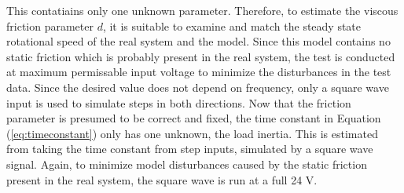 \documentclass[12pt,a4paper]{article}
\begin{document}
This contatiains only one unknown parameter. Therefore, to estimate the viscous
friction parameter $d$, it is suitable to examine and match the steady state
rotational speed of the real system and the model. Since this model contains no
static friction which is probably present in the real system, the test is
conducted at maximum permissable input voltage to minimize the disturbances in
the test data. Since the desired value does not depend on frequency, only a
square wave input is used to simulate steps in both directions. 
Now that the friction parameter is presumed to be correct and fixed, the time
constant in Equation (\ref{eq:timeconstant}) only has one unknown, the load
inertia. This is estimated from taking the time constant from step inputs,
simulated by a square wave signal. Again, to minimize model disturbances caused
by the static friction present in the real system, the square wave is run at a
full 24 V.
\end{document}
